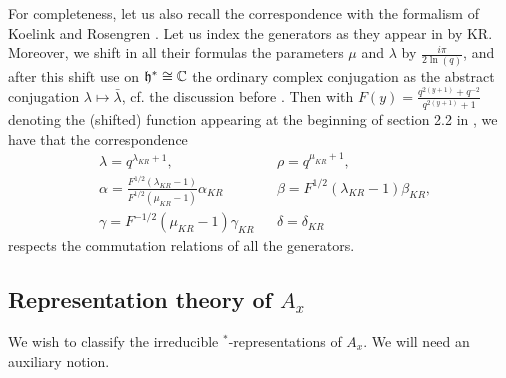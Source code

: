 



For completeness, let us also recall the correspondence with the formalism of Koelink and Rosengren \cite{KoR1}. Let us index the generators as they appear in \cite[Definition 2.6]{KoR1} by KR. Moreover, we shift in all their formulas the parameters $\mu$ and $\lambda$ by $\frac{i\pi}{2\ln(q)}$, and after this shift use on $\mathfrak{h}^* \cong \mathbb{C}$ the ordinary complex conjugation as the abstract conjugation $\lambda \mapsto \bar{\lambda}$, cf. the discussion before \cite[Definition 2.8]{KoR1}. Then with $F(y) = \frac{q^{2(y+1)}+q^{-2}}{q^{2(y+1)}+1}$ denoting the (shifted) function appearing at the beginning of section 2.2 in \cite{KoR1}, we have that the correspondence \begin{align*} &\lambda = q^{\lambda_{KR}+1},&& \rho = q^{\mu_{KR}+1},\\ &\alpha = \frac{F^{1/2}(\lambda_{KR}-1)}{F^{1/2}(\mu_{KR}-1)}\alpha_{KR}&& \beta = F^{1/2}(\lambda_{KR}-1)\beta_{KR},\\ &\gamma = F^{-1/2}(\mu_{KR}-1)\gamma_{KR}&& \delta = \delta_{KR}\end{align*} respects the commutation relations of all the generators. 


\subsection{Representation theory of $A_x$}

We wish to classify the irreducible $^*$-representations of $A_x$. We will need an auxiliary notion.



